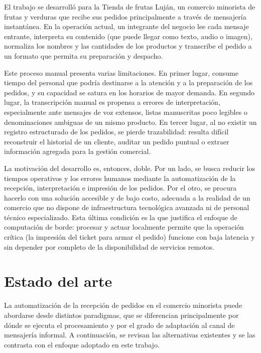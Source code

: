 El trabajo se desarrolló para la Tienda de frutas Luján, un comercio minorista de frutas y verduras que recibe sus pedidos principalmente a través de mensajería instantánea. En la operación actual, un integrante del negocio lee cada mensaje entrante, interpreta su contenido (que puede llegar como texto, audio o imagen), normaliza los nombres y las cantidades de los productos y transcribe el pedido a un formato que permita su preparación y despacho.

Este proceso manual presenta varias limitaciones. En primer lugar, consume tiempo del personal que podría destinarse a la atención y a la preparación de los pedidos, y su capacidad se satura en los horarios de mayor demanda. En segundo lugar, la transcripción manual es propensa a errores de interpretación, especialmente ante mensajes de voz extensos, listas manuscritas poco legibles o denominaciones ambiguas de un mismo producto. En tercer lugar, al no existir un registro estructurado de los pedidos, se pierde trazabilidad: resulta difícil reconstruir el historial de un cliente, auditar un pedido puntual o extraer información agregada para la gestión comercial.

La motivación del desarrollo es, entonces, doble. Por un lado, se busca reducir los tiempos operativos y los errores humanos mediante la automatización de la recepción, interpretación e impresión de los pedidos. Por el otro, se procura hacerlo con una solución accesible y de bajo costo, adecuada a la realidad de un comercio que no dispone de infraestructura tecnológica avanzada ni de personal técnico especializado. Esta última condición es la que justifica el enfoque de computación de borde: procesar y actuar localmente permite que la operación crítica (la impresión del ticket para armar el pedido) funcione con baja latencia y sin depender por completo de la disponibilidad de servicios remotos.


\section{Estado del arte}
\label{sec:estado_arte}

La automatización de la recepción de pedidos en el comercio minorista puede abordarse desde distintos paradigmas, que se diferencian principalmente por dónde se ejecuta el procesamiento y por el grado de adaptación al canal de mensajería informal. A continuación, se revisan las alternativas existentes y se las contrasta con el enfoque adoptado en este trabajo.

